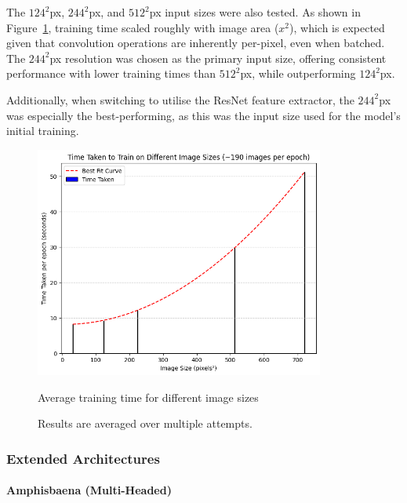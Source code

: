                         The \(124^2\)px, \(244^2\)px, and \(512^2\)px input sizes were also tested. As shown in Figure~\ref{fig:CNNSize_Time}, training time scaled roughly with image area (\(x^2\)), which is expected given that convolution operations are inherently per-pixel, even when batched. The \(244^2\)px resolution was chosen as the primary input size, offering consistent performance with lower training times than \(512^2\)px, while outperforming \(124^2\)px.
    
                        Additionally, when switching to utilise the ResNet feature extractor, the \(244^2\)px was especially the best-performing, as this was the input size used for the model's initial training.
                
                        \begin{figure}[h]
                            \centering
                            \includegraphics[width=0.85\textwidth]{images/CNNSize_Time.png}
                            \caption{Average training time for different image sizes}
                            \label{fig:CNNSize_Time}
                            \caption*{Results are averaged over multiple attempts.}
                        \end{figure}
    
            \subsubsection{Extended Architectures}
    
                \paragraph{Amphisbaena (Multi-Headed)}
    
